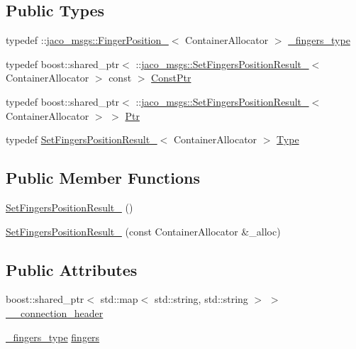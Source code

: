 \subsection*{Public Types}
\begin{DoxyCompactItemize}
\item 
typedef \+::\hyperlink{structjaco__msgs_1_1FingerPosition__}{jaco\+\_\+msgs\+::\+Finger\+Position\+\_\+}$<$ Container\+Allocator $>$ \hyperlink{structjaco__msgs_1_1SetFingersPositionResult___ad5514a6c863efc2214b9c9bf723bba78}{\+\_\+fingers\+\_\+type}
\item 
typedef boost\+::shared\+\_\+ptr$<$ \+::\hyperlink{structjaco__msgs_1_1SetFingersPositionResult__}{jaco\+\_\+msgs\+::\+Set\+Fingers\+Position\+Result\+\_\+}$<$ Container\+Allocator $>$ const  $>$ \hyperlink{structjaco__msgs_1_1SetFingersPositionResult___ac93b14dc1e7dcc93350b9dc71601c7f5}{Const\+Ptr}
\item 
typedef boost\+::shared\+\_\+ptr$<$ \+::\hyperlink{structjaco__msgs_1_1SetFingersPositionResult__}{jaco\+\_\+msgs\+::\+Set\+Fingers\+Position\+Result\+\_\+}$<$ Container\+Allocator $>$ $>$ \hyperlink{structjaco__msgs_1_1SetFingersPositionResult___a285189e67d1e40bc5804d90ccaf80d3e}{Ptr}
\item 
typedef \hyperlink{structjaco__msgs_1_1SetFingersPositionResult__}{Set\+Fingers\+Position\+Result\+\_\+}$<$ Container\+Allocator $>$ \hyperlink{structjaco__msgs_1_1SetFingersPositionResult___a7fa7a8fe235df40798b86e3363250526}{Type}
\end{DoxyCompactItemize}
\subsection*{Public Member Functions}
\begin{DoxyCompactItemize}
\item 
\hyperlink{structjaco__msgs_1_1SetFingersPositionResult___a1ac1e75666f81c1214cee8d725139cb9}{Set\+Fingers\+Position\+Result\+\_\+} ()
\item 
\hyperlink{structjaco__msgs_1_1SetFingersPositionResult___ac9ba7709d5a4f9008d5cd27ee99216f8}{Set\+Fingers\+Position\+Result\+\_\+} (const Container\+Allocator \&\+\_\+alloc)
\end{DoxyCompactItemize}
\subsection*{Public Attributes}
\begin{DoxyCompactItemize}
\item 
boost\+::shared\+\_\+ptr$<$ std\+::map$<$ std\+::string, std\+::string $>$ $>$ \hyperlink{structjaco__msgs_1_1SetFingersPositionResult___a967d4436a5b01551b8c0feffb1abefbd}{\+\_\+\+\_\+connection\+\_\+header}
\item 
\hyperlink{structjaco__msgs_1_1SetFingersPositionResult___ad5514a6c863efc2214b9c9bf723bba78}{\+\_\+fingers\+\_\+type} \hyperlink{structjaco__msgs_1_1SetFingersPositionResult___a5c4ac8ab3df0087e2ea584f4b419e91a}{fingers}
\end{DoxyCompactItemize}


